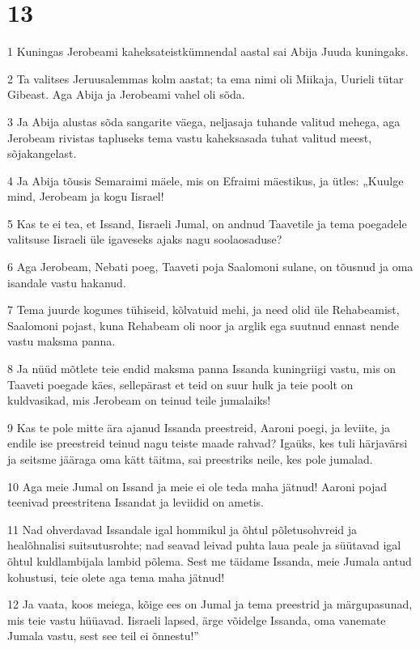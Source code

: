 \chapter{13}

\par 1 Kuningas Jerobeami kaheksateistkümnendal aastal sai Abija Juuda kuningaks.
\par 2 Ta valitses Jeruusalemmas kolm aastat; ta ema nimi oli Miikaja, Uurieli tütar Gibeast. Aga Abija ja Jerobeami vahel oli sõda.
\par 3 Ja Abija alustas sõda sangarite väega, neljasaja tuhande valitud mehega, aga Jerobeam rivistas tapluseks tema vastu kaheksasada tuhat valitud meest, sõjakangelast.
\par 4 Ja Abija tõusis Semaraimi mäele, mis on Efraimi mäestikus, ja ütles: „Kuulge mind, Jerobeam ja kogu Iisrael!
\par 5 Kas te ei tea, et Issand, Iisraeli Jumal, on andnud Taavetile ja tema poegadele valitsuse Iisraeli üle igaveseks ajaks nagu soolaosaduse?
\par 6 Aga Jerobeam, Nebati poeg, Taaveti poja Saalomoni sulane, on tõusnud ja oma isandale vastu hakanud.
\par 7 Tema juurde kogunes tühiseid, kõlvatuid mehi, ja need olid üle Rehabeamist, Saalomoni pojast, kuna Rehabeam oli noor ja arglik ega suutnud ennast nende vastu maksma panna.
\par 8 Ja nüüd mõtlete teie endid maksma panna Issanda kuningriigi vastu, mis on Taaveti poegade käes, sellepärast et teid on suur hulk ja teie poolt on kuldvasikad, mis Jerobeam on teinud teile jumalaiks!
\par 9 Kas te pole mitte ära ajanud Issanda preestreid, Aaroni poegi, ja leviite, ja endile ise preestreid teinud nagu teiste maade rahvad? Igaüks, kes tuli härjavärsi ja seitsme jääraga oma kätt täitma, sai preestriks neile, kes pole jumalad.
\par 10 Aga meie Jumal on Issand ja meie ei ole teda maha jätnud! Aaroni pojad teenivad preestritena Issandat ja leviidid on ametis.
\par 11 Nad ohverdavad Issandale igal hommikul ja õhtul põletusohvreid ja healõhnalisi suitsutusrohte; nad seavad leivad puhta laua peale ja süütavad igal õhtul kuldlambijala lambid põlema. Sest me täidame Issanda, meie Jumala antud kohustusi, teie olete aga tema maha jätnud!
\par 12 Ja vaata, koos meiega, kõige ees on Jumal ja tema preestrid ja märgupasunad, mis teie vastu hüüavad. Iisraeli lapsed, ärge võidelge Issanda, oma vanemate Jumala vastu, sest see teil ei õnnestu!”
